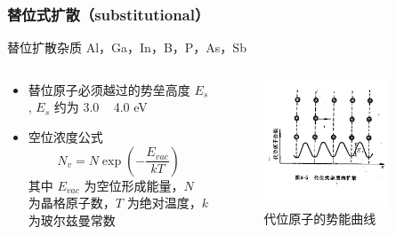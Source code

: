 \documentclass[xcolor=table,dvipsnames,svgnames,aspectratio=169]{ctexbeamer}
\begin{document}
\begin{frame}
  \frametitle{替位式扩散（substitutional）}

  \begin{block}{替位扩散杂质}
    Al，Ga，In，B，P，As，Sb
  \end{block}

  \begin{columns}
    \begin{column}{0.7\textwidth}
      \begin{itemize}
        \item 替位原子必须越过的势垒高度 $E_s$ , $E_s$ 约为 3.0 ~ 4.0 eV
        \item 空位浓度公式
          \[
            N_v = N \exp(-\frac{E_{vac}}{kT})
          \]
          其中 $E_{vac}$ 为空位形成能量，$N$ 为晶格原子数，$T$ 为绝对温度，$k$ 为玻尔兹曼常数
      \end{itemize}
    \end{column}
    \begin{column}{0.3\textwidth}
      \begin{figure}
        \centering
        \includegraphics[width=0.8\textwidth]{代位原子的势能曲线.png}
        \caption{代位原子的势能曲线}
      \end{figure}
    \end{column}
  \end{columns}

\end{frame}
\end{document}
